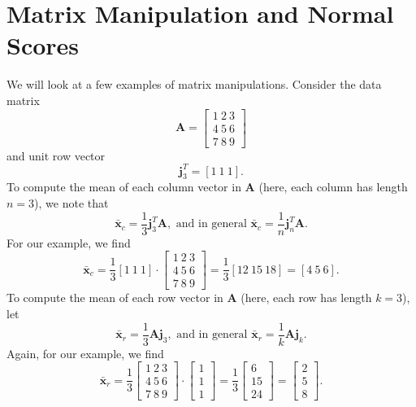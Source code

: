 \section{Matrix Manipulation and Normal Scores}
We will look at a few examples of matrix manipulations. Consider the data matrix
\begin{equation}
\mathbf{A} = \left[ \begin{array}{c}
1 \ 2 \ 3 \\
4 \ 5 \ 6 \\7 \ 8 \ 9
\end{array} \right ]
\end{equation}
and unit row vector
\begin{equation}
\mathbf{j}^T_3 = [1 \ 1 \ 1].
\end{equation} 
To compute the mean of each column vector in $\mathbf{A}$ (here, each column has length $n = 3$), we note that
\begin{equation}
\mathbf{\bar{x}} _c = \frac{1}{3} \mathbf{j}^T_3 \mathbf{A}, \mbox{ and in general } \mathbf{\bar{x}} _c = \frac{1}{n} \mathbf{j}^T_n \mathbf{A}.
\end{equation}	
For our example, we find
\begin{equation}
\mathbf{\bar{x}}_c = \frac{1}{3} \left[ 1 \  1\  1 \right ] \cdot
\left[ \begin{array}{c}
1 \ 2 \ 3 \\ 4 \ 5 \ 6 \\ 7 \ 8 \ 9 \end{array} \right ] 
= \frac{1}{3} \left[ 12 \ 15 \ 18 \right] =  \left[ 4 \ 5 \ 6 \right].
\end{equation}
To compute the mean of each row vector in $\mathbf{A}$ (here, each row has length $k = 3$), let
\begin{equation}
\mathbf{\bar{x}}_r = \frac{1}{3} \mathbf{Aj}_3, \mbox{ and in general }  \mathbf{\bar{x}}_r = \frac{1}{k} \mathbf{Aj}_k .
\end{equation} 
Again, for our example, we find
\begin{equation}
\mathbf{\bar{x}}_r = \frac{1}{3}
\left [ \begin{array}{c}
1 \ 2 \ 3 \\
4 \ 5 \ 6 \\
7 \ 8 \ 9 
\end{array} \right ] \cdot 
\left [ \begin{array}{c}
1\\
1\\
1
\end{array} \right ] = \frac{1}{3}
\left[
\begin{array}{c}
6 \\
15\\
24 \end{array} \right ] 
=
\left[
\begin{array}{c}
2 \\
5\\
8 \end{array} \right ].
\end{equation}
